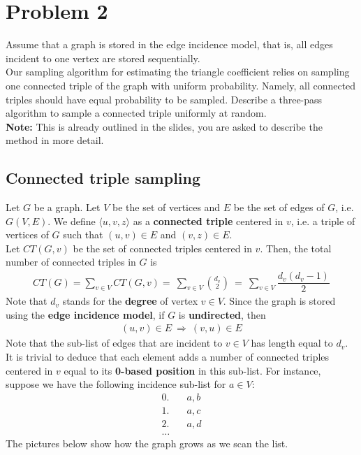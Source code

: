 
\section{Problem 2}

Assume that a graph is stored in the edge incidence model, that is, all edges incident to one vertex are stored sequentially.\\
Our sampling algorithm for estimating the triangle coefficient relies on sampling one connected triple of the graph with uniform probability. Namely, all connected triples should have equal probability to be sampled. Describe a three-pass algorithm to sample a connected triple uniformly at random.\\
\textbf{Note:} This is already outlined in the slides, you are asked to describe the method in more detail.

\subsection{Connected triple sampling}

Let $G$ be a graph. Let $V$ be the set of vertices and $E$ be the set of edges of $G$, i.e. $G(V, E)$. We define $\langle u,v,z\rangle$ as a \textbf{connected triple} centered in $v$, i.e. a triple of vertices of $G$ such that $(u,v) \in E$ and $(v,z) \in E$. \\
Let $CT(G,v)$ be the set of connected triples centered in $v$. Then, the total number of connected triples in $G$ is
\begin{align*}
CT(G) = \sum_{v \in V} CT(G,v) = \ \sum_{v \in V} \binom{d_v}{2} \ = \ \sum_{v \in V} \dfrac{d_v(d_v - 1)}{2}
\end{align*}
Note that $d_v$ stands for the \textbf{degree} of vertex $v \in V$. Since the graph is stored using the \textbf{edge incidence model}, if $G$ is \textbf{undirected}, then
\begin{align*}
(u,v) \in E \ \Rightarrow \ (v,u) \in E
\end{align*}
Note that the sub-list of edges that are incident to $v \in V$ has length equal to $d_v$. It is trivial to deduce that each element adds a number of connected triples centered in $v$ equal to its \textbf{0-based position} in this sub-list. For instance, suppose we have the following incidence sub-list for $a \in V$:
\begin{align*}
	0. \quad &a,b\\
	1. \quad &a,c\\
	2. \quad &a,d\\
	\ldots
\end{align*}
The pictures below show how the graph grows as we scan the list.

